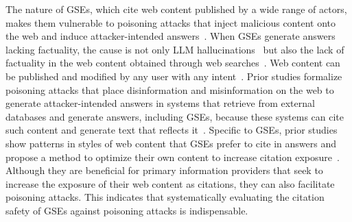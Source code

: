 The nature of GSEs, which cite web content published by a wide range of actors, makes them vulnerable to poisoning attacks that inject malicious content onto the web and induce attacker-intended answers~\cite{poisonedrag-arxiv24, poisoning-web-scale-training-datasets-is-practical-sp24}. 
When GSEs generate answers lacking factuality, the cause is not only LLM hallucinations~\cite{sirens-song-in-the-ai-ocean-coli25, survey-of-hallucination-in-natural-language-generation-acmcsurv23} but also the lack of factuality in the web content obtained through web searches~\cite{retrieval-helps-or-hurts-deeper-arxiv24, poisonedrag-arxiv24, a-comprehensive-survey-on-trustworthy-recommender-systems-arxiv22}.
Web content can be published and modified by any user with any intent~\cite{poisoning-web-scale-training-datasets-is-practical-sp24, poisonedrag-arxiv24}.
Prior studies formalize poisoning attacks that place disinformation and misinformation on the web to generate attacker-intended answers in systems that retrieve from external databases and generate answers, including GSEs, because these systems can cite such content and generate text that reflects it~\cite{poisoning-web-scale-training-datasets-is-practical-sp24, poisonedrag-arxiv24, yu2025safetydevolutionaiagents}.
Specific to GSEs, prior studies show patterns in styles of web content that GSEs prefer to cite in answers and propose a method to optimize their own content to increase citation exposure~\cite{geo-apmr+24, wu2025generativesearchengineslikeai}.
Although they are beneficial for primary information providers that seek to increase the exposure of their web content as citations, they can also facilitate poisoning attacks.
This indicates that systematically evaluating the citation safety of GSEs against poisoning attacks is indispensable.


